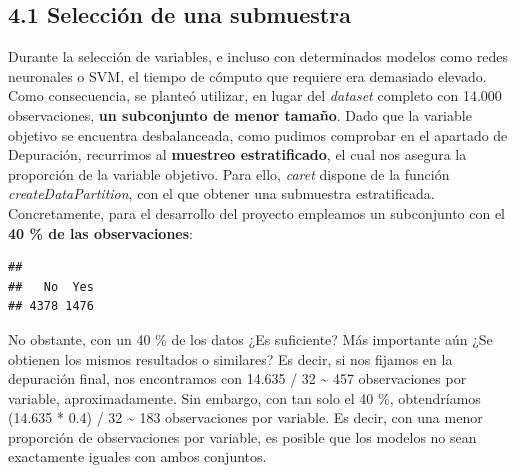 \documentclass[
]{article}
\newenvironment{Shaded}{\begin{snugshade}}{\end{snugshade}}
\newcommand{\CommentTok}[1]{\textcolor[rgb]{0.56,0.35,0.01}{\textit{#1}}}
\newcommand{\DataTypeTok}[1]{\textcolor[rgb]{0.13,0.29,0.53}{#1}}
\newcommand{\DecValTok}[1]{\textcolor[rgb]{0.00,0.00,0.81}{#1}}
\newcommand{\FloatTok}[1]{\textcolor[rgb]{0.00,0.00,0.81}{#1}}
\newcommand{\KeywordTok}[1]{\textcolor[rgb]{0.13,0.29,0.53}{\textbf{#1}}}
\newcommand{\NormalTok}[1]{#1}
\newcommand{\OperatorTok}[1]{\textcolor[rgb]{0.81,0.36,0.00}{\textbf{#1}}}
\newcommand{\OtherTok}[1]{\textcolor[rgb]{0.56,0.35,0.01}{#1}}
\newcommand{\StringTok}[1]{\textcolor[rgb]{0.31,0.60,0.02}{#1}}
\begin{document}
\hypertarget{selecciuxf3n-de-una-submuestra}{%
\subsection{4.1 Selección de una
submuestra}\label{selecciuxf3n-de-una-submuestra}}

Durante la selección de variables, e incluso con determinados modelos
como redes neuronales o SVM, el tiempo de cómputo que requiere era
demasiado elevado. Como consecuencia, se planteó utilizar, en lugar del
\emph{dataset} completo con 14.000 observaciones, \textbf{un subconjunto
de menor tamaño}. Dado que la variable objetivo se encuentra
desbalanceada, como pudimos comprobar en el apartado de Depuración,
recurrimos al \textbf{muestreo estratificado}, el cual nos asegura la
proporción de la variable objetivo. Para ello, \emph{caret} dispone de
la función \emph{createDataPartition}, con el que obtener una submuestra
estratificada. Concretamente, para el desarrollo del proyecto empleamos
un subconjunto con el \textbf{40 \% de las observaciones}:

\begin{Shaded}
\end{Shaded}

\begin{verbatim}
## 
##   No  Yes 
## 4378 1476
\end{verbatim}

No obstante, con un 40 \% de los datos ¿Es suficiente? Más importante
aún ¿Se obtienen los mismos resultados o similares? Es decir, si nos
fijamos en la depuración final, nos encontramos con 14.635 / 32
\textasciitilde{} 457 observaciones por variable, aproximadamente. Sin
embargo, con tan solo el 40 \%, obtendríamos (14.635 * 0.4) / 32
\textasciitilde{} 183 observaciones por variable. Es decir, con una
menor proporción de observaciones por variable, es posible que los
modelos no sean exactamente iguales con ambos conjuntos.
\end{document}
